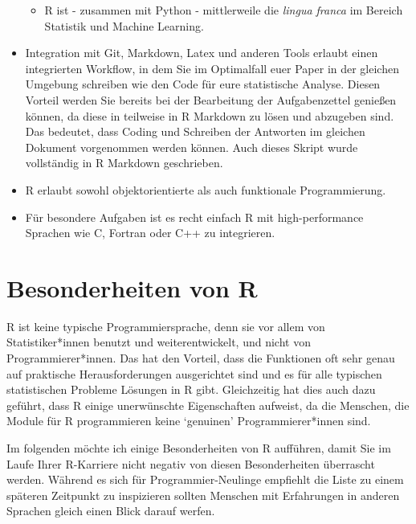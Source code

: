 \documentclass[]{book}
\providecommand{\tightlist}{%
  \setlength{\itemsep}{0pt}\setlength{\parskip}{0pt}}
\begin{document}
\begin{itemize}
  \begin{itemize}
  \tightlist
  \item
    R ist - zusammen mit Python - mittlerweile die \emph{lingua franca}
    im Bereich Statistik und Machine Learning.
  \end{itemize}
\item
  Integration mit Git, Markdown, Latex und anderen Tools erlaubt einen
  integrierten Workflow, in dem Sie im Optimalfall euer Paper in der
  gleichen Umgebung schreiben wie den Code für eure statistische
  Analyse. Diesen Vorteil werden Sie bereits bei der Bearbeitung der
  Aufgabenzettel genießen können, da diese in teilweise in R Markdown zu
  lösen und abzugeben sind. Das bedeutet, dass Coding und Schreiben der
  Antworten im gleichen Dokument vorgenommen werden können. Auch dieses
  Skript wurde vollständig in R Markdown geschrieben.
\item
  R erlaubt sowohl objektorientierte als auch funktionale
  Programmierung.
\item
  Für besondere Aufgaben ist es recht einfach R mit high-performance
  Sprachen wie C, Fortran oder C++ zu integrieren.
\end{itemize}

\section{Besonderheiten von R}\label{besonderheiten-von-r}

R ist keine typische Programmiersprache, denn sie vor allem von
Statistiker*innen benutzt und weiterentwickelt, und nicht von
Programmierer*innen. Das hat den Vorteil, dass die Funktionen oft sehr
genau auf praktische Herausforderungen ausgerichtet sind und es für alle
typischen statistischen Probleme Lösungen in R gibt. Gleichzeitig hat
dies auch dazu geführt, dass R einige unerwünschte Eigenschaften
aufweist, da die Menschen, die Module für R programmieren keine
`genuinen' Programmierer*innen sind.

Im folgenden möchte ich einige Besonderheiten von R aufführen, damit Sie
im Laufe Ihrer R-Karriere nicht negativ von diesen Besonderheiten
überrascht werden. Während es sich für Programmier-Neulinge empfiehlt
die Liste zu einem späteren Zeitpunkt zu inspizieren sollten Menschen
mit Erfahrungen in anderen Sprachen gleich einen Blick darauf werfen.
\end{document}
